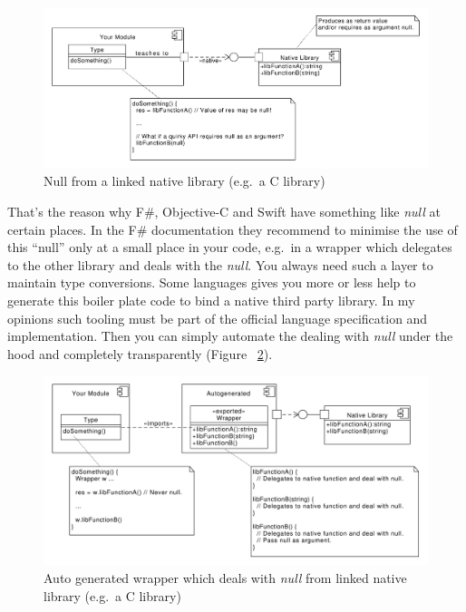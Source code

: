 \documentclass[11pt, a4paper]{report}
\begin{document}
\begin{figure}[ht]
    \centering
    \includegraphics[width=350pt]{grafics/Null_from_linked_native_libs.pdf}
    \caption{Null from a linked native library (e.g.\ a C library)}
    \label{fig:Null_from_linked_native_libs}
\end{figure}

That's the reason why F\#, Objective-C and Swift have something like \textit{null} at certain places. In the F\# documentation they recommend to minimise the use of this ``null'' only at a small place in your code, e.g.\ in a wrapper which delegates to the other library and deals with the \textit{null}. You always need such a layer to maintain type conversions. Some languages gives you more or less help to generate this boiler plate code to bind a native third party library. In my opinions such tooling must be part of the official language specification and implementation. Then you can simply automate the dealing with \textit{null} under the hood and completely transparently (Figure
 ~\ref{fig:Generated_wrapper_for_linked_native_libs}).

\begin{figure}[ht]
    \centering
    \includegraphics[width=350pt]{grafics/Generated_wrapper_for_linked_native_libs.pdf}
    \caption{Auto generated wrapper which deals with \textit{null} from linked native library (e.g.\ a C library)}
    \label{fig:Generated_wrapper_for_linked_native_libs}
\end{figure}
\end{document}

